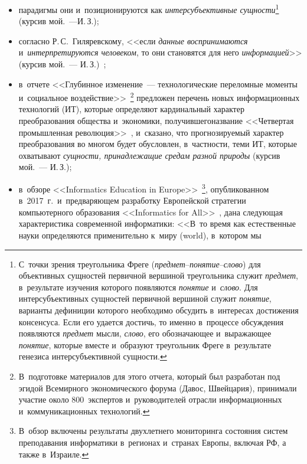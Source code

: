 \begin{multicols}{2}
\begin{itemize}
\item[\,]парадигмы они и~позиционируются как 
\textit{интерсубъективные сущности}\footnote[1]{С~точки зрения треугольника Фреге  
(\textit{предмет}--\textit{по\-ня\-тие}--\textit{сло\-во}) для объективных сущностей первичной вершиной 
треугольника служит \textit{предмет}, в~результате изучения которого появляются \textit{понятие} 
и~\textit{слово}. Для интерсубъективных сущностей первичной вершиной служит \textit{понятие}, варианты 
дефиниции которого необходимо обсудить в~интересах достижения консенсуса. Если его удается достичь, то 
именно в~процессе обсуждения появляются \textit{предмет} мысли, \textit{слово}, его обозначающее 
и~выражающее \textit{понятие}, которые вместе и~образуют треугольник Фреге в~результате генезиса 
интерсубъективной сущности.} (курсив мой.~---\linebreak  И.\,З.);
  \item  согласно Р.\,С.~Гиляревскому, <<если \textit{данные воспринимаются} и~\textit{интерпретируются человеком}, то они становятся для него 
\textit{информацией}>> (курсив мой.~--- И.\,З.)~\cite[с.~19]{18-zac};
\item в~отчете <<Глубинное изменение~--- технологические переломные 
моменты и~социальное воздействие>>~\cite{19-zac}\footnote[2]{В~подготовке 
материалов для этого отчета, который был разработан под эгидой Всемирного экономического форума (Давос, 
Швейцария), принимали участие около 800~экспертов и~руководителей отрасли информационных 
и~коммуникационных технологий.} предложен перечень новых информационных 
технологий (ИТ), которые определяют кардинальный характер преобразования 
общества и~экономики, получившего\linebreak название <<Четвертая промышленная 
революция>>~\cite{20-zac}, и~сказано, что прогнозируемый характер 
преобразования во многом будет обуслов\-лен, в~частности, теми ИТ, которые 
охватывают \textit{сущности, принадлежащие средам разной природы} 
(курсив мой.~--- И.\,З.);
  \item в~обзоре <<Informatics Education in Europe>>~\cite{21-zac}\footnote[3]{В~обзор включены результаты двухлетнего мониторинга состояния систем 
преподавания информатики в~регионах и~странах Европы, включая РФ, а также в~Израиле.}, 
опубликованном в~2017~г.\ и~предваряющем разработку Европейской 
стратегии компьютерного образования <<Informatics for All>>~\cite{22-zac}, 
дана следующая характеристика современной информатики: <<В~то время как 
естественные науки определяются применительно к~миру (world), в~котором мы 

\end{itemize}
\end{multicols}
